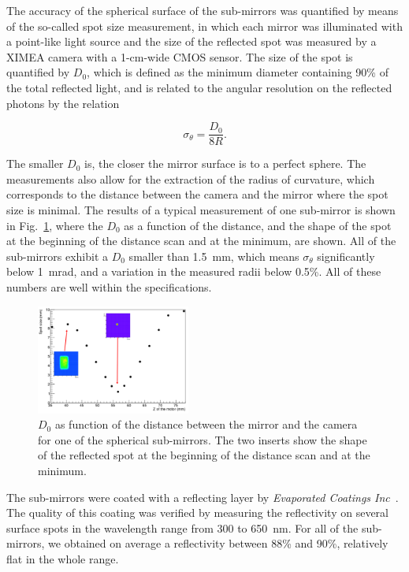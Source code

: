 \documentclass[5p,times,twocolumn]{elsarticle}
\begin{document}
The accuracy of the spherical surface of the sub-mirrors was quantified by means of the so-called spot size
measurement, in which each mirror was illuminated with a point-like light source and the size of the reflected spot
was measured by a XIMEA camera with a 1-cm-wide CMOS sensor. The size of the spot is quantified by $D_0$, which
is defined as the minimum diameter containing 90\% of the total reflected light, and is related to the angular resolution
on the reflected photons by the relation

\begin{equation}
  \sigma_{\theta} = \frac{D_0}{8 R}.
\end{equation}

The smaller $D_0$ is, the closer the mirror surface is to a perfect sphere. The measurements also allow for the
extraction of the radius of curvature, which corresponds to the distance between the camera and the mirror where
the spot size is minimal. The results of a typical measurement of one sub-mirror is shown in Fig.~\ref{Fig:SpotCMA},
where the $D_0$ as a function of the distance, and the shape of the spot at the beginning of the distance scan and
at the minimum, are shown. All of the sub-mirrors exhibit a $D_0$ smaller than 1.5~mm, which means $\sigma_{\theta}$
significantly below 1~mrad, and a variation in the measured radii below 0.5\%. All of these numbers are well within the
specifications.

\begin{figure}
\begin{center}
\includegraphics[width=0.45\textwidth]{SpotCMA.pdf}
\caption{$D_0$ as function of the distance between the mirror and the camera for one of the spherical sub-mirrors.
  The two inserts show the shape of the reflected spot at the beginning of the distance scan and at the minimum.}
\label{Fig:SpotCMA}
\end{center}
\end{figure}

The sub-mirrors were coated with a reflecting layer by {\it Evaporated Coatings Inc}~\cite{REF:ECI}. The quality of
this coating was verified by measuring the reflectivity on several surface spots in the wavelength range from 300 to
650~nm. For all of the sub-mirrors, we obtained on average a reflectivity between 88\% and 90\%, relatively flat in
the whole range.
\end{document}
